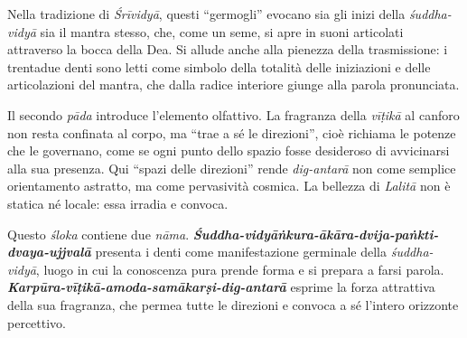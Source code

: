 Nella tradizione di \textit{Śrīvidyā}, questi “germogli” evocano sia gli inizi della \textit{śuddha-vidyā} sia il mantra stesso, che, come un seme, si apre in suoni articolati attraverso la bocca della Dea. Si allude anche alla pienezza della trasmissione: i trentadue denti sono letti come simbolo della totalità delle iniziazioni e delle articolazioni del mantra, che dalla radice interiore giunge alla parola pronunciata.

Il secondo \textit{pāda} introduce l’elemento olfattivo. La fragranza della \textit{vīṭikā} al canforo non resta confinata al corpo, ma “trae a sé le direzioni”, cioè richiama le potenze che le governano, come se ogni punto dello spazio fosse desideroso di avvicinarsi alla sua presenza. Qui “spazi delle direzioni” rende \textit{dig-antarā} non come semplice orientamento astratto, ma come pervasività cosmica. La bellezza di \textit{Lalitā} non è statica né locale: essa irradia e convoca.

Questo \textit{śloka} contiene due \textit{nāma}.  
\textbf{\textit{Śuddha-vidyāṅkura-ākāra-dvija-paṅkti-dvaya-ujjvalā}} presenta i denti come manifestazione germinale della \textit{śuddha-vidyā}, luogo in cui la conoscenza pura prende forma e si prepara a farsi parola.  
\textbf{\textit{Karpūra-vīṭikā-amoda-samākarṣi-dig-antarā}} esprime la forza attrattiva della sua fragranza, che permea tutte le direzioni e convoca a sé l’intero orizzonte percettivo.
